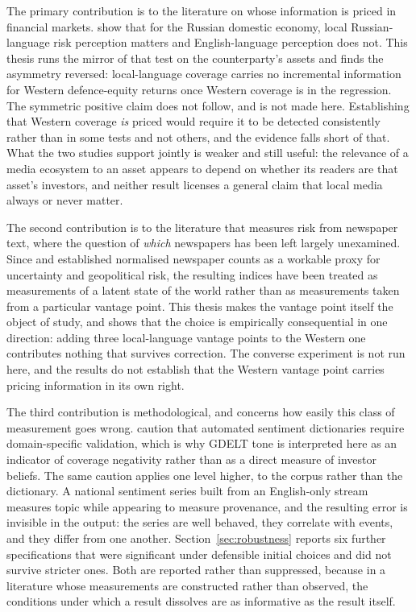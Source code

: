 \documentclass[12pt,a4paper]{article}
\begin{document}
The primary contribution is to the literature on whose information is priced in financial markets. \citet{bondarenko2024} show that for the Russian domestic economy, local Russian-language risk perception matters and English-language perception does not. This thesis runs the mirror of that test on the counterparty's assets and finds the asymmetry reversed: local-language coverage carries no incremental information for Western defence-equity returns once Western coverage is in the regression. The symmetric positive claim does not follow, and is not made here. Establishing that Western coverage \textit{is} priced would require it to be detected consistently rather than in some tests and not others, and the evidence falls short of that. What the two studies support jointly is weaker and still useful: the relevance of a media ecosystem to an asset appears to depend on whether its readers are that asset's investors, and neither result licenses a general claim that local media always or never matter.

The second contribution is to the literature that measures risk from newspaper text, where the question of \textit{which} newspapers has been left largely unexamined. Since \citet{baker2016} and \citet{caldara2022} established normalised newspaper counts as a workable proxy for uncertainty and geopolitical risk, the resulting indices have been treated as measurements of a latent state of the world rather than as measurements taken from a particular vantage point. This thesis makes the vantage point itself the object of study, and shows that the choice is empirically consequential in one direction: adding three local-language vantage points to the Western one contributes nothing that survives correction. The converse experiment is not run here, and the results do not establish that the Western vantage point carries pricing information in its own right.

The third contribution is methodological, and concerns how easily this class of measurement goes wrong. \citet{loughran2011textual} caution that automated sentiment dictionaries require domain-specific validation, which is why GDELT tone is interpreted here as an indicator of coverage negativity rather than as a direct measure of investor beliefs. The same caution applies one level higher, to the corpus rather than the dictionary. A national sentiment series built from an English-only stream measures topic while appearing to measure provenance, and the resulting error is invisible in the output: the series are well behaved, they correlate with events, and they differ from one another. Section~\ref{sec:robustness} reports six further specifications that were significant under defensible initial choices and did not survive stricter ones. Both are reported rather than suppressed, because in a literature whose measurements are constructed rather than observed, the conditions under which a result dissolves are as informative as the result itself.
\end{document}
